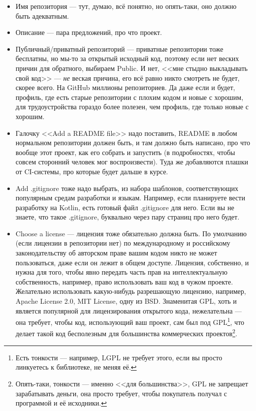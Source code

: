 \documentclass{../../text-style}
\begin{document}
\begin{itemize}
    \item Имя репозитория --- тут, думаю, всё понятно, но опять-таки, оно должно быть адекватным.
    \item Описание --- пара предложений, про что проект.
    \item Публичный/приватный репозиторий --- приватные репозитории тоже бесплатны, но мы-то за открытый исходный код, поэтому если нет веских причин для обратного, выбираем Public. И нет, <<мне стыдно выкладывать свой код>> --- \emph{не} веская причина, его всё равно никто смотреть не будет, скорее всего. На GitHub миллионы репозиториев. Да даже если и будет, профиль, где есть старые репозитории с плохим кодом и новые с хорошим, для трудоустройства гораздо более полезен, чем профиль, где только новые с хорошим.
    \item Галочку <<Add a README file>> надо поставить, README в любом нормальном репозитории должен быть, и там должно быть написано, про что вообще этот проект, как его собрать и запустить (в подробностях, чтобы совсем сторонний человек мог воспроизвести). Туда же добавляются плашки от CI-системы, про которые будет дальше в курсе.
    \item Add .gitignore тоже надо выбрать, из набора шаблонов, соответствующих популярным средам разработки и языкам. Например, если планируете вести разработку на Kotlin, есть готовый файл .gitignore для него. Если вы не знаете, что такое .gitignore, буквально через пару страниц про него будет.
    \item Choose a license --- лицензия тоже обязательно должна быть. По умолчанию (если лицензии в репозитории нет) по международному и российскому законодательству об авторском праве вашим кодом никто не может пользоваться, даже если он лежит в общем доступе. Лицензия, собственно, и нужна для того, чтобы явно передать часть прав на интеллектуальную собственность, например, право использовать ваш код в чужом проекте. Желательно использовать какую-нибудь разрешающую лицензию, например, Apache License 2.0, MIT License, одну из BSD. Знаменитая GPL, хоть и является популярной для лицензирования открытого кода, нежелательна --- она требует, чтобы код, использующий ваш проект, сам был под GPL\footnote{Есть тонкости --- например, LGPL не требует этого, если вы просто линкуетесь к библиотеке, не меняя её.}, что делает такой код бесполезным для большинства коммерческих проектов\footnote{Опять-таки, тонкости --- именно <<для большинства>>, GPL не запрещает зарабатывать деньги, она просто требует, чтобы покупатель получал с программой и её исходники.}.
\end{itemize}
\end{document}
